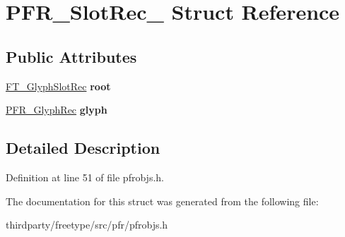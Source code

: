\hypertarget{struct_p_f_r___slot_rec__}{}\section{P\+F\+R\+\_\+\+Slot\+Rec\+\_\+ Struct Reference}
\label{struct_p_f_r___slot_rec__}
\subsection*{Public Attributes}
\begin{DoxyCompactItemize}
\item 
\mbox{\label{struct_p_f_r___slot_rec___aedb79342ff3d90d9c694f5653d717fbe}} 
\hyperlink{struct_f_t___glyph_slot_rec__}{F\+T\+\_\+\+Glyph\+Slot\+Rec} {\bfseries root}
\item 
\mbox{\label{struct_p_f_r___slot_rec___a54b90014b57732fcb505c865920c7c4e}} 
\hyperlink{struct_p_f_r___glyph_rec__}{P\+F\+R\+\_\+\+Glyph\+Rec} {\bfseries glyph}
\end{DoxyCompactItemize}


\subsection{Detailed Description}


Definition at line 51 of file pfrobjs.\+h.



The documentation for this struct was generated from the following file\+:\begin{DoxyCompactItemize}
\item 
thirdparty/freetype/src/pfr/pfrobjs.\+h\end{DoxyCompactItemize}

